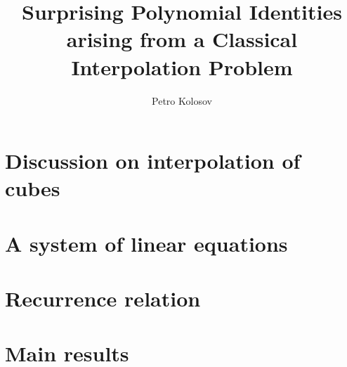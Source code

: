 \documentclass[12pt,letterpaper,oneside,reqno]{amsart}
\title[Surprising Polynomial Identities arising from a Class. Interpolation Problem]
{Surprising Polynomial Identities arising from a Classical Interpolation Problem}
\author[Petro Kolosov]{Petro Kolosov}
\begin{document}
    \maketitle

%        




    \section{Discussion on interpolation of cubes}
    \label{sec:the-problem-of-interpolation-of-cubes}
    


    \section{A system of linear equations}
    \label{sec:system-of-linear-equations-approach}
    


    \section{Recurrence relation}
    \label{sec:recurrence-relation-approach}
    


    \section{Main results}
    \label{sec:main-results}
    


%    
%
%
%    
%
%
%    
%
%
%    
\end{document}
